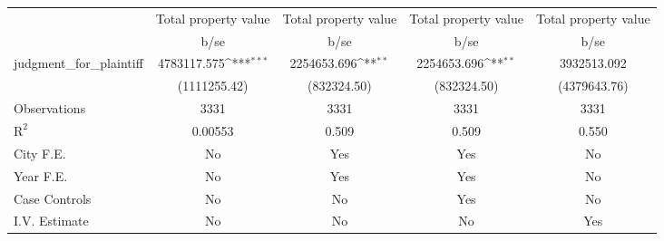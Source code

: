 {
\def\sym#1{\ifmmode^{#1}\else\(^{#1}\)\fi}
\begin{tabular}{l*{4}{c}}
\toprule
                    &\multicolumn{1}{c}{\hspace{0.25cm}Total property value}&\multicolumn{1}{c}{\hspace{0.25cm}Total property value}&\multicolumn{1}{c}{\hspace{0.25cm}Total property value}&\multicolumn{1}{c}{\hspace{0.25cm}Total property value}\\
                    &        b/se         &        b/se         &        b/se         &        b/se         \\
\midrule
judgment\_for\_plaintiff& 4783117.575\sym{***}& 2254653.696\sym{**} & 2254653.696\sym{**} & 3932513.092         \\
                    &(1111255.42)         & (832324.50)         & (832324.50)         &(4379643.76)         \\
\midrule
Observations        &        3331         &        3331         &        3331         &        3331         \\
$\text{R}^2$        &     0.00553         &       0.509         &       0.509         &       0.550         \\
City F.E.           &          No         &         Yes         &         Yes         &          No         \\
Year F.E.           &          No         &         Yes         &         Yes         &          No         \\
Case Controls       &          No         &          No         &         Yes         &          No         \\
I.V. Estimate       &          No         &          No         &          No         &         Yes         \\
\bottomrule
\end{tabular}
}
